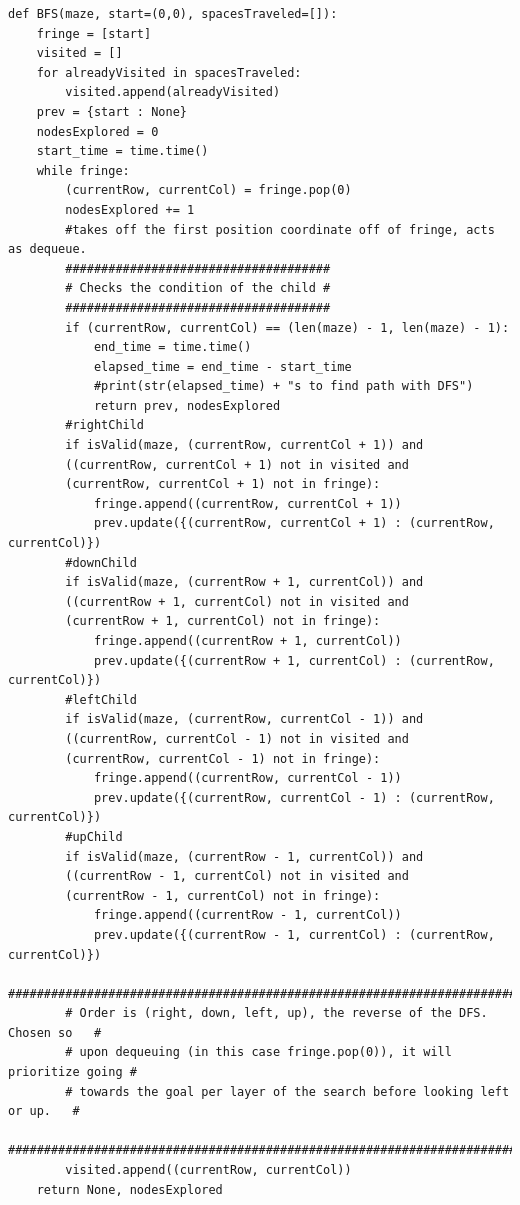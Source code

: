 \documentclass[11pt]{article}
\begin{document}
\begin{verbatim}
def BFS(maze, start=(0,0), spacesTraveled=[]):
    fringe = [start]
    visited = []
    for alreadyVisited in spacesTraveled:
        visited.append(alreadyVisited)
    prev = {start : None}
    nodesExplored = 0
    start_time = time.time()
    while fringe:
        (currentRow, currentCol) = fringe.pop(0)
        nodesExplored += 1
        #takes off the first position coordinate off of fringe, acts as dequeue.
        #####################################
        # Checks the condition of the child #
        #####################################
        if (currentRow, currentCol) == (len(maze) - 1, len(maze) - 1):
            end_time = time.time()
            elapsed_time = end_time - start_time
            #print(str(elapsed_time) + "s to find path with DFS")
            return prev, nodesExplored
        #rightChild
        if isValid(maze, (currentRow, currentCol + 1)) and 
        ((currentRow, currentCol + 1) not in visited and 
        (currentRow, currentCol + 1) not in fringe):
            fringe.append((currentRow, currentCol + 1))
            prev.update({(currentRow, currentCol + 1) : (currentRow, currentCol)})
        #downChild
        if isValid(maze, (currentRow + 1, currentCol)) and 
        ((currentRow + 1, currentCol) not in visited and 
        (currentRow + 1, currentCol) not in fringe):
            fringe.append((currentRow + 1, currentCol))
            prev.update({(currentRow + 1, currentCol) : (currentRow, currentCol)})
        #leftChild
        if isValid(maze, (currentRow, currentCol - 1)) and 
        ((currentRow, currentCol - 1) not in visited and 
        (currentRow, currentCol - 1) not in fringe):
            fringe.append((currentRow, currentCol - 1))
            prev.update({(currentRow, currentCol - 1) : (currentRow, currentCol)})
        #upChild
        if isValid(maze, (currentRow - 1, currentCol)) and 
        ((currentRow - 1, currentCol) not in visited and 
        (currentRow - 1, currentCol) not in fringe):
            fringe.append((currentRow - 1, currentCol))
            prev.update({(currentRow - 1, currentCol) : (currentRow, currentCol)})
        #########################################################################
        # Order is (right, down, left, up), the reverse of the DFS. Chosen so   #
        # upon dequeuing (in this case fringe.pop(0)), it will prioritize going #
        # towards the goal per layer of the search before looking left or up.   #
        #########################################################################
        visited.append((currentRow, currentCol))
    return None, nodesExplored
\end{verbatim}
\end{document}
